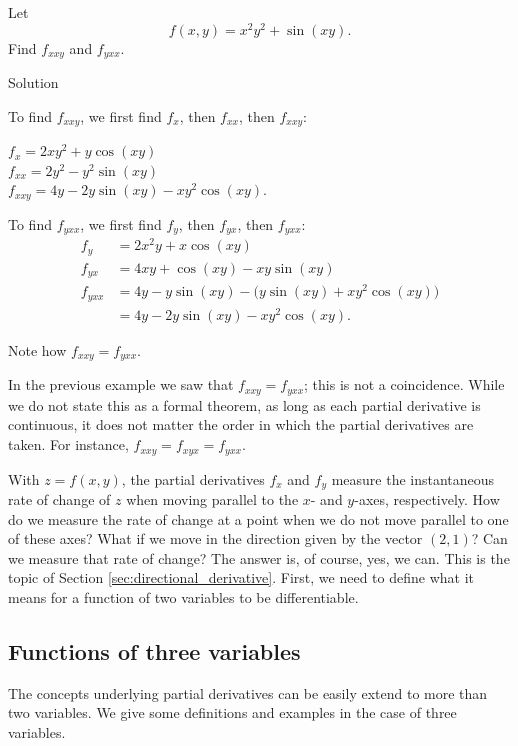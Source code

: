 \begin{example}\label{ex_partial9}
Let $$f(x,y) = x^2y^2+\sin(xy).$$
 Find $f_{xxy}$ and $f_{yxx}$. 

Solution 

 To find $f_{xxy}$, we first find $f_x$, then $f_{xx}$, then $f_{xxy}$:
\begin{multicols}{2}
	$f_x = 2xy^2+y\cos(xy)$\\
	$f_{xx} = 2y^2-y^2\sin(xy)$\\
	$f_{xxy} = 4y-2y\sin(xy) - xy^2\cos(xy).$
	\end{multicols}
	To find $f_{yxx}$, we first find $f_y$, then $f_{yx}$, then $f_{yxx}$:
	\allowdisplaybreaks
	\begin{align*}
	f_y &= 2x^2y+x\cos(xy)\\
	f_{yx} &= 4xy + \cos(xy) - xy\sin(xy)\\
	f_{yxx} &= 4y-y\sin(xy) - \big(y\sin(xy) + xy^2\cos(xy)\big)\\ &= 4y-2y\sin(xy)-xy^2\cos(xy).
	\end{align*}
	
	Note how $f_{xxy} = f_{yxx}$.
	
\end{example}

In the previous example we saw that $f_{xxy} = f_{yxx}$; this is not a coincidence. While we do not state this as a formal theorem, as long as each partial derivative is continuous, it does not matter the order in which the partial derivatives are taken. For instance, $f_{xxy} = f_{xyx} = f_{yxx}$. 

With $z=f(x,y)$, the partial derivatives $f_x$ and $f_y$ measure the instantaneous rate of change of $z$ when moving parallel to the $x$- and $y$-axes, respectively. How do we measure the rate of change at a point when we do not move parallel to one of these axes? What if we move in the direction given by the vector $\left( 2,1\right)$? Can we measure that rate of change? The answer is, of course, yes, we can. This is the topic of Section \ref{sec:directional_derivative}. First, we need to define what it means for a function of two variables to be differentiable.

\ifcalculus
\subsection{Functions of three variables}

The concepts underlying partial derivatives can be easily extend to more than two variables. We give some definitions and examples in the case of three variables.

